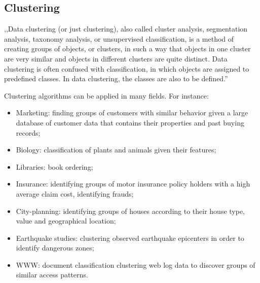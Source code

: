 \subsection{Clustering}
\label{sec:clustering}

,,Data clustering (or just clustering), also called cluster analysis, segmentation analysis, taxonomy analysis, or unsupervised classification,
is a method of creating groups of objects, or clusters, in such a way that objects in one cluster are very similar and objects in different clusters are quite distinct.
Data clustering is often confused with classification, in which objects are assigned to predefined classes. In data clustering, the classes are also to be defined.''~\cite{data_clustering_book}


Clustering algorithms can be applied in many fields. For instance:

\begin{itemize}
\item Marketing: finding groups of customers with similar behavior given a large database of customer data that contains their properties and past buying records;
\item Biology: classification of plants and animals given their features;
\item Libraries: book ordering;
\item Insurance: identifying groups of motor insurance policy holders with a high average claim cost, identifying frauds;
\item City-planning: identifying groups of houses according to their house type, value and geographical location;
\item Earthquake studies: clustering observed earthquake epicenters in order to identify dangerous zones;
\item WWW: document classification clustering web log data to discover groups of similar access patterns.
\end{itemize}